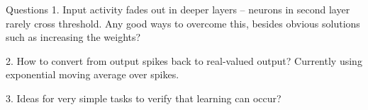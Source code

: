 \documentclass[t]{beamer}
\begin{document}
\begin{frame}{Questions}
    1. Input activity fades out in deeper layers -- neurons in second layer rarely cross threshold. Any good ways to overcome this, besides obvious solutions such as increasing the weights?
    
    2. How to convert from output spikes back to real-valued output? Currently using exponential moving average over spikes.
    
    3. Ideas for very simple tasks to verify that learning can occur?
\end{frame}
\end{document}
